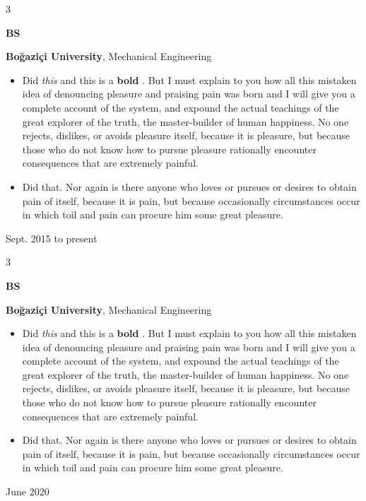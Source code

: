 \documentclass[10pt, letterpaper]{article}
\newenvironment{highlights}{
    \begin{itemize}[
        topsep=0.10 cm,
        parsep=0.10 cm,
        partopsep=0pt,
        itemsep=0pt,
        leftmargin=0.4 cm + 10pt
    ]
}{
    \end{itemize}
} %
\newenvironment{threecolentry}[3][]{
    \onecolentry
    \def\thirdColumn{#3}
    \setcolumnwidth{1 cm, \fill, 4.5 cm}
    \begin{paracol}{3}
    {\raggedright #2} \switchcolumn
}{
    \switchcolumn \raggedleft \thirdColumn
    \end{paracol}
    \endonecolentry
} %
\let\hrefWithoutArrow\href
\renewcommand{\href}[2]{\hrefWithoutArrow{#1}{\mbox{\ifthenelse{\equal{#2}{}}{ }{#2 }\raisebox{.15ex}{\footnotesize \faExternalLink*}}}}
\begin{document}
        \vspace{0.2 cm}

        \begin{threecolentry}{\textbf{BS}}{
            Sept. 2015 to present
        }
            \textbf{Boğaziçi University}, Mechanical Engineering
            \begin{highlights}
                \item Did \textit{this} and this is a \textbf{bold} \href{https://example.com}{link}. But I must explain to you how all this mistaken idea of denouncing pleasure and praising pain was born and I will give you a complete account of the system, and expound the actual teachings of the great explorer of the truth, the master-builder of human happiness. No one rejects, dislikes, or avoids pleasure itself, because it is pleasure, but because those who do not know how to pursue pleasure rationally encounter consequences that are extremely painful.
                \item Did that. Nor again is there anyone who loves or pursues or desires to obtain pain of itself, because it is pain, but because occasionally circumstances occur in which toil and pain can procure him some great pleasure.
            \end{highlights}
        \end{threecolentry}

        \vspace{0.2 cm}

        \begin{threecolentry}{\textbf{BS}}{
            June 2020
        }
            \textbf{Boğaziçi University}, Mechanical Engineering
            \begin{highlights}
                \item Did \textit{this} and this is a \textbf{bold} \href{https://example.com}{link}. But I must explain to you how all this mistaken idea of denouncing pleasure and praising pain was born and I will give you a complete account of the system, and expound the actual teachings of the great explorer of the truth, the master-builder of human happiness. No one rejects, dislikes, or avoids pleasure itself, because it is pleasure, but because those who do not know how to pursue pleasure rationally encounter consequences that are extremely painful.
                \item Did that. Nor again is there anyone who loves or pursues or desires to obtain pain of itself, because it is pain, but because occasionally circumstances occur in which toil and pain can procure him some great pleasure.
            \end{highlights}
        \end{threecolentry}
\end{document}
